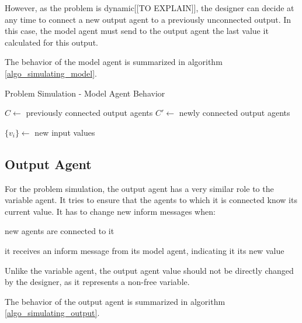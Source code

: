 However, as the problem is dynamic[[TO EXPLAIN]], the designer can decide at any time to connect a new output agent to a previously unconnected output. In this case, the model agent must send to the output agent the last value it calculated for this output.

The behavior of the model agent is summarized in algorithm \ref{algo_simulating_model}.

\begin{algorithm}
\caption{Problem Simulation - Model Agent Behavior}
\label{algo_simulating_model}

	$C \leftarrow$ previously connected output agents\;
	$C'\leftarrow$ newly connected output agents\;
	
	$\{v_i\} \leftarrow$ new input values\;
			
	
	
\end{algorithm}

\subsection{Output Agent}

For the problem simulation, the output agent has a very similar role to the variable agent. It tries to ensure that the agents to which it is connected know its current value. It has to change new inform messages when:
\begin{compactitem}
\item new agents are connected to it
\item it receives an inform message from its model agent, indicating it its new value
\end{compactitem}

Unlike the variable agent, the output agent value should not be directly changed by the designer, as it represents a non-free variable.

The behavior of the output agent is summarized in algorithm \ref{algo_simulating_output}.


